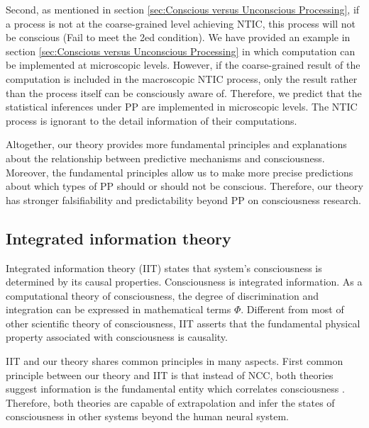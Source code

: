 \documentclass[utf8]{article}
\begin{document}
    		Second, as mentioned in section \ref{sec:Conscious versus Unconscious Processing}, if a process is not at the coarse-grained level achieving NTIC, this process will not be conscious (Fail to meet the 2\lowercase{ed} condition). We have provided an example in section \ref{sec:Conscious versus Unconscious Processing} in which computation can be implemented at microscopic levels. However, if the coarse-grained result of the computation is included in the macroscopic NTIC process, only the result rather than the process itself can be consciously aware of. Therefore, we predict that the statistical inferences under PP are implemented in microscopic levels. The NTIC process is ignorant to the detail information of their computations. 
    
            Altogether, our theory provides more fundamental principles and explanations about the relationship between predictive mechanisms and consciousness. Moreover, the fundamental principles allow us to make more precise predictions about which types of PP should or should not be conscious. Therefore, our theory has stronger falsifiability and predictability beyond PP on consciousness research.
        
        
		\subsection{Integrated information theory}
		Integrated information theory (IIT) states that system's consciousness is determined by its causal properties. Consciousness is integrated information. As a computational theory of consciousness, the degree of discrimination and integration can be expressed in mathematical terms $\Phi$. Different from most of other scientific theory of consciousness, IIT asserts that the fundamental physical property associated with consciousness is causality.
		
		IIT and our theory shares common principles in many aspects. First common principle between our theory and IIT is that instead of NCC, both theories suggest information is the fundamental entity which correlates consciousness . Therefore, both theories are capable of extrapolation and infer the states of consciousness in other systems beyond the human neural system.
		
\end{document}

